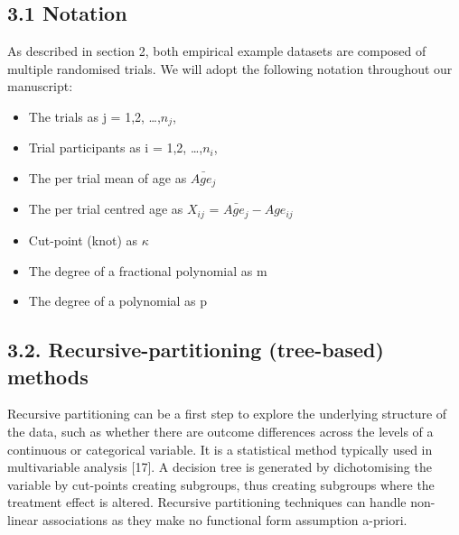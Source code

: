 \documentclass[14pt,]{article}
\providecommand{\tightlist}{%
  \setlength{\itemsep}{0pt}\setlength{\parskip}{0pt}}
\begin{document}
\hypertarget{notation}{%
\subsection{3.1 Notation}\label{notation}}

As described in section 2, both empirical example datasets are composed
of multiple randomised trials. We will adopt the following notation
throughout our manuscript:

\begin{itemize}
\tightlist
\item
  The trials as j = 1,2, \ldots,\(n_j\),
\item
  Trial participants as i = 1,2, \ldots,\(n_i\),
\item
  The per trial mean of age as \(\bar{Age_j}\)
\item
  The per trial centred age as \(X_{ij}\) = \(\bar{Age_j} - Age_{ij}\)
\item
  Cut-point (knot) as \(\kappa\)
\item
  The degree of a fractional polynomial as m
\item
  The degree of a polynomial as p
\end{itemize}

\hypertarget{recursive-partitioning-tree-based-methods}{%
\subsection{3.2. Recursive-partitioning (tree-based)
methods}\label{recursive-partitioning-tree-based-methods}}

Recursive partitioning can be a first step to explore the underlying
structure of the data, such as whether there are outcome differences
across the levels of a continuous or categorical variable. It is a
statistical method typically used in multivariable analysis {[}17{]}. A
decision tree is generated by dichotomising the variable by cut-points
creating subgroups, thus creating subgroups where the treatment effect
is altered. Recursive partitioning techniques can handle non-linear
associations as they make no functional form assumption a-priori.\\

\par
\end{document}
